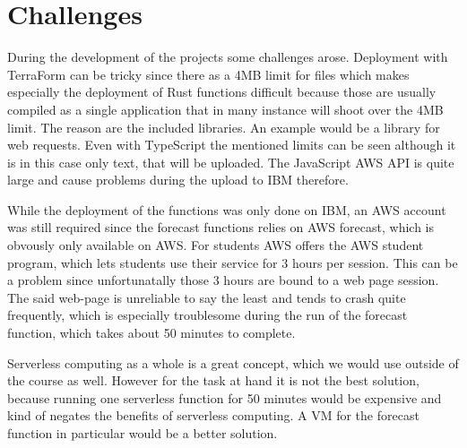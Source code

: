 \chapter{\label{chap:challenges}Challenges}

During the development of the projects some challenges arose. Deployment with
TerraForm can be tricky since there as a 4MB limit for files which makes
especially the deployment of Rust functions difficult because those are usually
compiled as a single application that in many instance will shoot over the 4MB
limit. The reason are the included libraries. An example would be a library for
web requests. Even with TypeScript the mentioned limits can be seen although it
is in this case only text, that will be uploaded. The JavaScript AWS API is
quite large and cause problems during the upload to IBM therefore.

While the deployment of the functions was only done on IBM, an AWS account was
still required since the forecast functions relies on AWS forecast, which is
obvously only available on AWS. For students AWS offers the AWS student
program, which lets students use their service for 3 hours per session. This
can be a problem since unfortunatally those 3 hours are bound to a web page
session.  The said web-page is unreliable to say the least and tends to crash
quite frequently, which is especially troublesome during the run of the
forecast function, which takes about 50 minutes to complete.

Serverless computing as a whole is a great concept, which we would use outside
of the course as well. However for the task at hand it is not the best solution,
because running one serverless function for 50 minutes would be expensive and
kind of negates the benefits of serverless computing. A VM for the forecast function
in particular would be a better solution.

